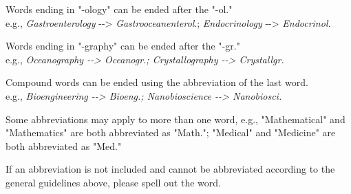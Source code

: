 \documentclass[10pt]{article}
\begin{document}
\begin{guideitems}
  \item Words ending in "-ology" can be ended after the "-ol."\\
    e.g., \textit{Gastroenterology} -{}-> \textit{Gastrooceanenterol}.; \textit{Endocrinology} -{}-> \textit{Endocrinol.}
  \item Words ending in "-graphy" can be ended after the "-gr."\\
    e.g., \textit{Oceanography -{}-> Oceanogr.; Crystallography -{}-> Crystallgr.}
  \item Compound words can be ended using the abbreviation of the last word.\\
    e.g., \textit{Bioengineering -{}-> Bioeng.; Nanobioscience -{}-> Nanobiosci.}
  \item Some abbreviations may apply to more than one word, e.g., "Mathematical" and "Mathematics" are both abbreviated as "Math."; "Medical" and "Medicine" are both abbreviated as "Med."
  \item If an abbreviation is not included and cannot be abbreviated according to the general guidelines above, please spell out the word.
\end{guideitems}
\end{document}
